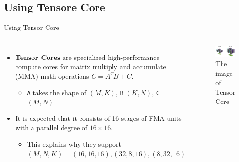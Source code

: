 \documentclass[dvipdfmx, 11pt, aspectratio=169]{beamer}   %
\begin{document}
\subsection{Using Tensore Core}
\begin{frame}[fragile]{Using Tensor Core}
\begin{columns}
\begin{itemize}
  \item \textbf{Tensor Cores} are specialized high-performance compute cores for matrix multiply and accumulate (MMA) math operations $C=A^TB+C$.
  \begin{itemize}
    \item \lstinline|A| takes the shape of $(M,K)$, \lstinline|B| $(K,N)$, \lstinline|C| $(M,N)$
  \end{itemize}
  \item It is expected that it consists of 16 stages of FMA units with a parallel degree of $16\times16$.
  \begin{itemize}
    \item This explains why they support $(M,N,K)=(16,16,16), (32,8,16), (8,32,16)$
  \end{itemize}
\end{itemize}
\begin{figure}
  \includegraphics[scale=0.3]{img/FP16TensorCore.png}
  \caption{The image of Tensor Core}
\end{figure}
\end{columns}
\end{frame}
\end{document}
